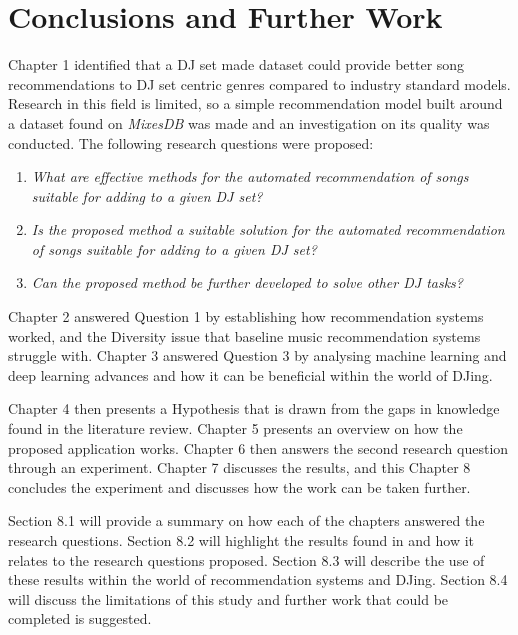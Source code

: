 
\graphicspath{{Chapter7/}}

\chapter{Conclusions and Further Work} 

Chapter 1 identified that a DJ set made dataset could provide better song recommendations to DJ set centric genres compared to industry standard models. Research in this field is limited, so a simple recommendation model built around a dataset found on \textit{MixesDB} was made and an investigation on its quality was conducted. The following research questions were proposed:

\begin{enumerate}
	\item \textit{What are effective methods for the automated recommendation of songs suitable
		for adding to a given DJ set?}
	\item \textit{Is the proposed method a suitable solution for the automated recommendation of songs suitable for adding to a given DJ set?}
	\item \textit{Can the proposed method be further developed to solve other DJ tasks?}
\end{enumerate}

Chapter 2 answered Question 1 by establishing how recommendation systems worked, and the Diversity issue that baseline music recommendation systems struggle with. Chapter 3 answered Question 3 by analysing machine learning and deep learning advances and how it can be beneficial within the world of DJing. 

Chapter 4 then presents a Hypothesis that is drawn from the gaps in knowledge found in the literature review. Chapter 5 presents an overview on how the proposed application works. Chapter 6 then answers the second research question through an experiment. Chapter 7 discusses the results, and this Chapter 8 concludes the experiment and discusses how the work can be taken further.

Section 8.1 will provide a summary on how each of the chapters answered the research questions.
Section 8.2 will highlight the results found in and how it relates to the research questions proposed. Section 8.3 will describe the use of these results within the world of  recommendation systems and DJing. Section 8.4 will discuss the limitations of
this  study and  further work that could be completed is suggested.

